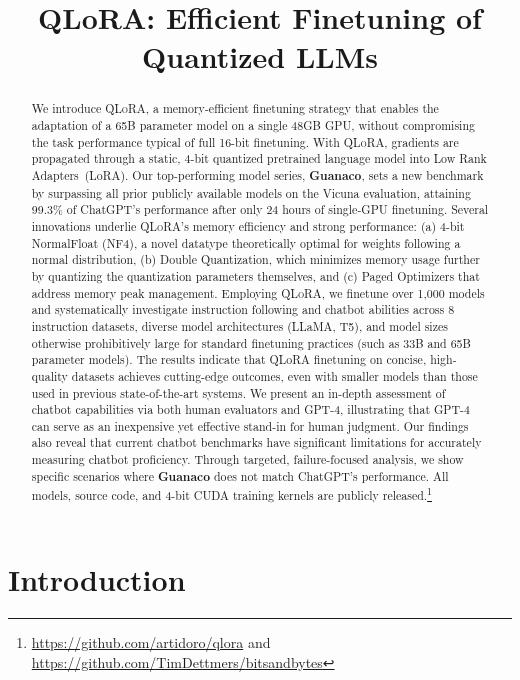 \title{QLoRA: Efficient Finetuning of Quantized LLMs}

\begin{abstract}
We introduce \textsc{QLoRA}, a memory-efficient finetuning strategy that enables the adaptation of a 65B parameter model on a single 48GB GPU, without compromising the task performance typical of full 16-bit finetuning. With \textsc{QLoRA}, gradients are propagated through a static, 4-bit quantized pretrained language model into Low Rank Adapters~(LoRA). Our top-performing model series, \textbf{Guanaco}, sets a new benchmark by surpassing all prior publicly available models on the Vicuna evaluation, attaining 99.3\% of ChatGPT's performance after only 24 hours of single-GPU finetuning. Several innovations underlie \textsc{QLoRA}'s memory efficiency and strong performance: (a) 4-bit NormalFloat (NF4), a novel datatype theoretically optimal for weights following a normal distribution, (b) Double Quantization, which minimizes memory usage further by quantizing the quantization parameters themselves, and (c) Paged Optimizers that address memory peak management. Employing \textsc{QLoRA}, we finetune over 1,000 models and systematically investigate instruction following and chatbot abilities across 8 instruction datasets, diverse model architectures (LLaMA, T5), and model sizes otherwise prohibitively large for standard finetuning practices (such as 33B and 65B parameter models). The results indicate that QLoRA finetuning on concise, high-quality datasets achieves cutting-edge outcomes, even with smaller models than those used in previous state-of-the-art systems. We present an in-depth assessment of chatbot capabilities via both human evaluators and GPT-4, illustrating that GPT-4 can serve as an inexpensive yet effective stand-in for human judgment. Our findings also reveal that current chatbot benchmarks have significant limitations for accurately measuring chatbot proficiency. Through targeted, failure-focused analysis, we show specific scenarios where \textbf{Guanaco} does not match ChatGPT's performance. All models, source code, and 4-bit CUDA training kernels are publicly released.\footnote{\url{https://github.com/artidoro/qlora} and \url{https://github.com/TimDettmers/bitsandbytes}}
\end{abstract}

\section{Introduction}

